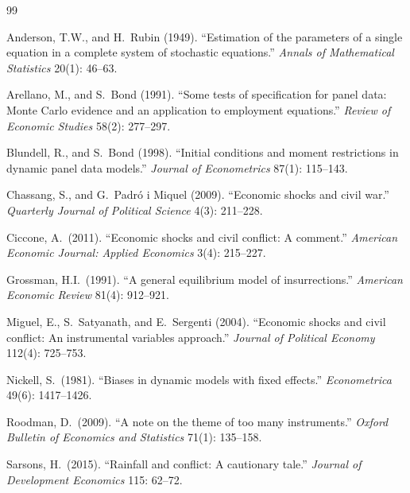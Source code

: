 \documentclass[11pt,a4paper]{article}
\begin{document}
\renewcommand{\refname}{References}
\begin{thebibliography}{99}\small

Anderson, T.W., and H.\ Rubin (1949). ``Estimation of the parameters
  of a single equation in a complete system of stochastic equations.''
  \emph{Annals of Mathematical Statistics} 20(1): 46--63.

Arellano, M., and S.\ Bond (1991). ``Some tests of specification for
  panel data: Monte Carlo evidence and an application to employment
  equations.'' \emph{Review of Economic Studies} 58(2): 277--297.

Blundell, R., and S.\ Bond (1998). ``Initial conditions and moment
  restrictions in dynamic panel data models.''
  \emph{Journal of Econometrics} 87(1): 115--143.

Chassang, S., and G.\ Padr\'o i Miquel (2009). ``Economic shocks and
  civil war.'' \emph{Quarterly Journal of Political Science} 4(3):
  211--228.

Ciccone, A.\ (2011). ``Economic shocks and civil conflict: A
  comment.'' \emph{American Economic Journal: Applied Economics}
  3(4): 215--227.

Grossman, H.I.\ (1991). ``A general equilibrium model of
  insurrections.'' \emph{American Economic Review} 81(4): 912--921.

Miguel, E., S.\ Satyanath, and E.\ Sergenti (2004). ``Economic
  shocks and civil conflict: An instrumental variables approach.''
  \emph{Journal of Political Economy} 112(4): 725--753.

Nickell, S.\ (1981). ``Biases in dynamic models with fixed
  effects.'' \emph{Econometrica} 49(6): 1417--1426.

Roodman, D.\ (2009). ``A note on the theme of too many instruments.''
  \emph{Oxford Bulletin of Economics and Statistics} 71(1): 135--158.

Sarsons, H.\ (2015). ``Rainfall and conflict: A cautionary tale.''
  \emph{Journal of Development Economics} 115: 62--72.


\end{thebibliography}
\end{document}
